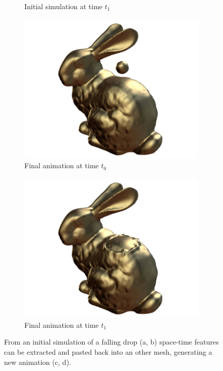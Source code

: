 \begin{figure}[!h]
\begin{subfigure}[b]{0.45\linewidth}
    \caption{\label{fig:result_detail:drop_1}\footnotesize{Initial simulation at time $t_1$}}
    \end{subfigure}
    \hspace{0.1cm}
    \begin{subfigure}[b]{0.45\linewidth}
    \includegraphics[width=\textwidth]{images/fluidsculpting-mig2016/teaser/bunny_04.png}
    \caption{\label{fig:result_detail:bunny_0}\footnotesize{Final animation at time $t_0$}}
    \end{subfigure}
    \hspace{0.1cm}
    \begin{subfigure}[b]{0.45\linewidth}
    \includegraphics[width=\textwidth]{images/fluidsculpting-mig2016/teaser/bunny_12.png}
    \caption{\label{fig:result_detail:bunny_1}\footnotesize{Final animation at time $t_1$}}
    \end{subfigure}
    \caption[Fluid sculpting: Drop on bunny]{\label{fig:result:teaser}
        From an initial simulation of a falling drop (a, b) space-time features can be extracted and pasted back into an other mesh, generating a new animation (c, d).
    }
\end{figure}


